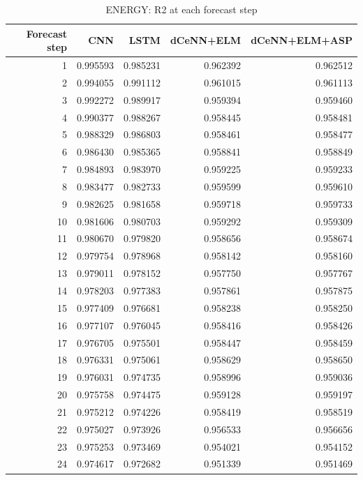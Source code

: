 \begin{table}
\caption{ENERGY: R2 at each forecast step}
\begin{tabular}{rrrrr}
\toprule
Forecast step & CNN & LSTM & dCeNN+ELM & dCeNN+ELM+ASP \\
\midrule
1 & 0.995593 & 0.985231 & 0.962392 & 0.962512 \\
2 & 0.994055 & 0.991112 & 0.961015 & 0.961113 \\
3 & 0.992272 & 0.989917 & 0.959394 & 0.959460 \\
4 & 0.990377 & 0.988267 & 0.958445 & 0.958481 \\
5 & 0.988329 & 0.986803 & 0.958461 & 0.958477 \\
6 & 0.986430 & 0.985365 & 0.958841 & 0.958849 \\
7 & 0.984893 & 0.983970 & 0.959225 & 0.959233 \\
8 & 0.983477 & 0.982733 & 0.959599 & 0.959610 \\
9 & 0.982625 & 0.981658 & 0.959718 & 0.959733 \\
10 & 0.981606 & 0.980703 & 0.959292 & 0.959309 \\
11 & 0.980670 & 0.979820 & 0.958656 & 0.958674 \\
12 & 0.979754 & 0.978968 & 0.958142 & 0.958160 \\
13 & 0.979011 & 0.978152 & 0.957750 & 0.957767 \\
14 & 0.978203 & 0.977383 & 0.957861 & 0.957875 \\
15 & 0.977409 & 0.976681 & 0.958238 & 0.958250 \\
16 & 0.977107 & 0.976045 & 0.958416 & 0.958426 \\
17 & 0.976705 & 0.975501 & 0.958447 & 0.958459 \\
18 & 0.976331 & 0.975061 & 0.958629 & 0.958650 \\
19 & 0.976031 & 0.974735 & 0.958996 & 0.959036 \\
20 & 0.975758 & 0.974475 & 0.959128 & 0.959197 \\
21 & 0.975212 & 0.974226 & 0.958419 & 0.958519 \\
22 & 0.975027 & 0.973926 & 0.956533 & 0.956656 \\
23 & 0.975253 & 0.973469 & 0.954021 & 0.954152 \\
24 & 0.974617 & 0.972682 & 0.951339 & 0.951469 \\
\bottomrule
\end{tabular}
\end{table}
